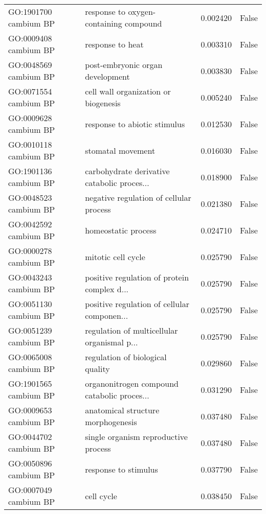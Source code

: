 \begin{tabular}{llrl}
GO:1901700 cambium BP       &       response to oxygen-containing compound &       0.002420 &  False \\
GO:0009408 cambium BP       &                             response to heat &       0.003310 &  False \\
GO:0048569 cambium BP       &             post-embryonic organ development &       0.003830 &  False \\
GO:0071554 cambium BP       &         cell wall organization or biogenesis &       0.005240 &  False \\
GO:0009628 cambium BP       &                 response to abiotic stimulus &       0.012530 &  False \\
GO:0010118 cambium BP       &                            stomatal movement &       0.016030 &  False \\
GO:1901136 cambium BP       &  carbohydrate derivative catabolic proces... &       0.018900 &  False \\
GO:0048523 cambium BP       &      negative regulation of cellular process &       0.021380 &  False \\
GO:0042592 cambium BP       &                          homeostatic process &       0.024710 &  False \\
GO:0000278 cambium BP       &                           mitotic cell cycle &       0.025790 &  False \\
GO:0043243 cambium BP       &  positive regulation of protein complex d... &       0.025790 &  False \\
GO:0051130 cambium BP       &  positive regulation of cellular componen... &       0.025790 &  False \\
GO:0051239 cambium BP       &  regulation of multicellular organismal p... &       0.025790 &  False \\
GO:0065008 cambium BP       &             regulation of biological quality &       0.029860 &  False \\
GO:1901565 cambium BP       &  organonitrogen compound catabolic proces... &       0.031290 &  False \\
GO:0009653 cambium BP       &           anatomical structure morphogenesis &       0.037480 &  False \\
GO:0044702 cambium BP       &         single organism reproductive process &       0.037480 &  False \\
GO:0050896 cambium BP       &                         response to stimulus &       0.037790 &  False \\
GO:0007049 cambium BP       &                                   cell cycle &       0.038450 &  False \\

\end{tabular}
